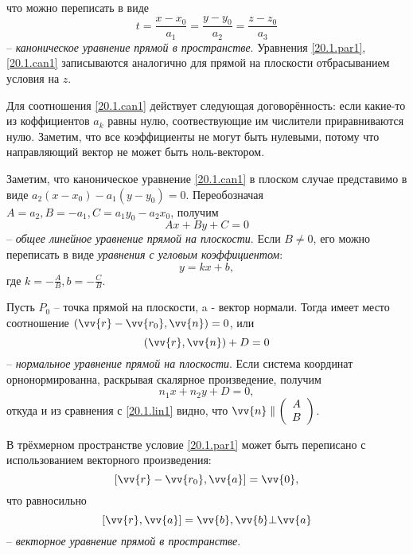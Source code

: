 что можно переписать в виде
\begin{equation}\label{20.1.can1}
t=\frac{x-x_0}{a_1}=\frac{y-y_0}{a_2}=\frac{z-z_0}{a_3}
\end{equation}
-- \textit{каноническое уравнение прямой в пространстве}.
  Уравнения \ref{20.1.par1}, \ref{20.1.can1} записываются аналогично для прямой на плоскости отбрасыванием условия на $z$.
  \begin{notion}
  Для соотношения \ref{20.1.can1} действует следующая договорённость: если какие-то из коффициентов $a_k$ равны нулю, соотвествующие им числители приравниваются нулю. Заметим, что все коэффициенты не могут быть нулевыми, потому что направляющий вектор не может быть ноль-вектором.
  \end{notion}
  
  Заметим, что каноническое уравнение \ref{20.1.can1} в плоском случае представимо в виде $a_2(x-x_0)-a_1(y-y_0)=0$. Переобозначая $A=a_2, B=-a_1, C=a_1y_0-a_2x_0$, получим
  \begin{equation}\label{20.1.lin1}
  Ax+By+C=0
  \end{equation}
  -- \textit{общее линейное уравнение прямой на плоскости}. Если $B\neq0$, его можно переписать в виде \textit{уравнения с угловым коэффициентом}:
  \begin{equation}\label{20.1.ang1}
  y=kx+b,
  \end{equation}
  где $k=-\frac AB, b=-\frac CB$.
    
  Пусть $P_0$ -- точка прямой на плоскости, a  - вектор нормали. Тогда имеет место соотношение $(\vv{r}-\vv{r_0},\vv{n})=0$, или
  \begin{equation}\label{20.1.norm1}
  (\vv{r},\vv{n})+D=0
  \end{equation}
  -- \textit{нормальное уравнение прямой на плоскости}. Если система координат орнонормированна, раскрывая скалярное произведение, получим
  \begin{equation}
  n_1x+n_2y+D=0,
  \end{equation}
откуда и из сравнения с \ref{20.1.lin1} видно, что $\vv{n}\parallel\left(\begin{array}{crl}
A\\
B
\end{array}\right)$.   

  В трёхмерном пространстве условие \ref{20.1.par1} может быть переписано с использованием векторного произведения:
  \begin{equation}\label{20.1.vect1}
  [\vv{r}-\vv{r_0},\vv{a}]=\vv{0}, 
  \end{equation}
  что равносильно
  \begin{equation}\label{20.1.vect2}
  [\vv{r},\vv{a}]=\vv{b}, \vv{b}\bot\vv{a}
  \end{equation}
  -- \textit{векторное уравнение прямой в пространстве}.
  
